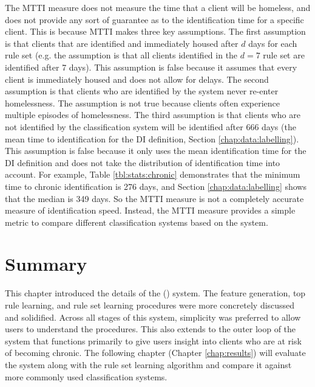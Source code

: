 The MTTI measure does not measure the time that a client will be homeless, and does not provide any sort of guarantee as to the identification time for a specific client.
This is because MTTI makes three key assumptions. The first assumption is that clients that are identified and immediately housed after $d$ days for each rule set (e.g. the assumption is that all clients identified in the $d=7$ rule set are identified after 7 days). This assumption is false because it assumes that every client is immediately housed and does not allow for delays.
The second assumption is that clients who are identified by the system never re-enter homelessness. The assumption is not true because clients often experience multiple episodes of homelessness.
The third assumption is that clients who are not identified by the classification system will be identified after 666 days (the mean time to identification for the DI definition, Section \ref{chap:data:labelling}). This assumption is false because it only uses the mean identification time for the DI definition and does not take the distribution of identification time into account. For example, Table \ref{tbl:stats:chronic} demonstrates that the minimum time to chronic identification is 276 days, and Section \ref{chap:data:labelling} shows that the median is 349 days.
So the MTTI measure is not a completely accurate measure of identification speed. Instead, the MTTI measure provides a simple metric to compare different classification systems based on the \Abb system.


\section{Summary}

This chapter introduced the details of the \Name (\Abb) system. The feature generation, top rule learning, and rule set learning procedures were more concretely discussed and solidified. Across all stages of this system, simplicity was preferred to allow users to understand the procedures. This also extends to the outer loop of the \Abb system that functions primarily to give users insight into clients who are at risk of becoming chronic. The following chapter (Chapter \ref{chap:results}) will evaluate the \Abb system along with the \Abb rule set learning algorithm and compare it against more commonly used classification systems.

